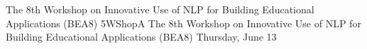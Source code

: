 \begin{wsschedule}
{The 8th Workshop on Innovative Use of NLP for Building Educational Applications (BEA8)}
{5}{WShopA}
{The 8th Workshop on Innovative Use of NLP for Building Educational Applications (BEA8)}
{Thursday, June 13}{\WShopLocA}

\end{wsschedule}
